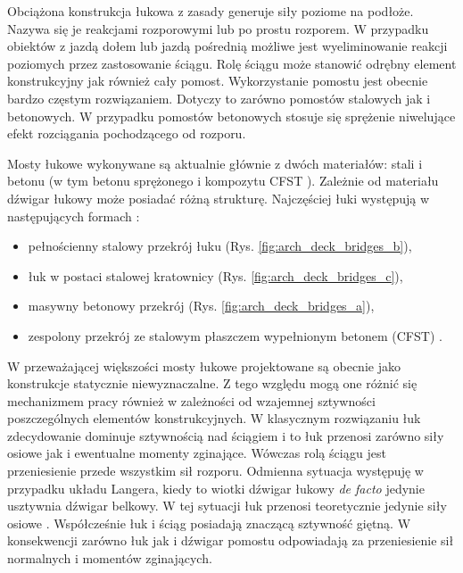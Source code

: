 Obciążona konstrukcja łukowa z zasady generuje siły poziome na podłoże. Nazywa się je reakcjami rozporowymi lub po prostu rozporem. W przypadku obiektów z jazdą dołem lub jazdą pośrednią możliwe jest wyeliminowanie reakcji poziomych przez zastosowanie ściągu. Rolę ściągu może stanowić odrębny element konstrukcyjny jak również cały pomost. Wykorzystanie pomostu jest obecnie bardzo częstym rozwiązaniem. Dotyczy to zarówno pomostów stalowych jak i betonowych. W przypadku pomostów betonowych stosuje się sprężenie niwelujące efekt rozciągania pochodzącego od rozporu.

Mosty łukowe wykonywane są aktualnie głównie z dwóch materiałów: stali i betonu (w tym betonu sprężonego i kompozytu CFST ). Zależnie od materiału dźwigar łukowy może posiadać różną strukturę. Najczęściej łuki występują w następujących formach \parencite{Cholewo1965}:
\begin{itemize}
	\item pełnościenny stalowy przekrój łuku (Rys. \ref{fig:arch_deck_bridges_b}),
	\item łuk w postaci stalowej kratownicy (Rys. \ref{fig:arch_deck_bridges_c}),
	\item masywny betonowy przekrój (Rys. \ref{fig:arch_deck_bridges_a}),
	\item zespolony przekrój ze stalowym płaszczem wypełnionym betonem (CFST) \parencite{Abramski2019}.
\end{itemize}

W przeważającej większości mosty łukowe projektowane są obecnie jako konstrukcje statycznie niewyznaczalne. Z tego względu mogą one różnić się mechanizmem pracy również w zależności od wzajemnej sztywności poszczególnych elementów konstrukcyjnych. W klasycznym rozwiązaniu łuk zdecydowanie dominuje sztywnością nad ściągiem i to łuk przenosi zarówno siły osiowe jak i ewentualne momenty zginające. Wówczas rolą ściągu jest przeniesienie przede wszystkim sił rozporu. Odmienna sytuacja występuję w przypadku układu Langera, kiedy to wiotki dźwigar łukowy \textit{de facto} jedynie usztywnia dźwigar belkowy. W tej sytuacji łuk przenosi teoretycznie jedynie siły osiowe \parencite{Lin2017}. Współcześnie łuk i ściąg posiadają znaczącą sztywność giętną. W konsekwencji zarówno łuk jak i dźwigar pomostu odpowiadają za przeniesienie sił normalnych i momentów zginających. 

